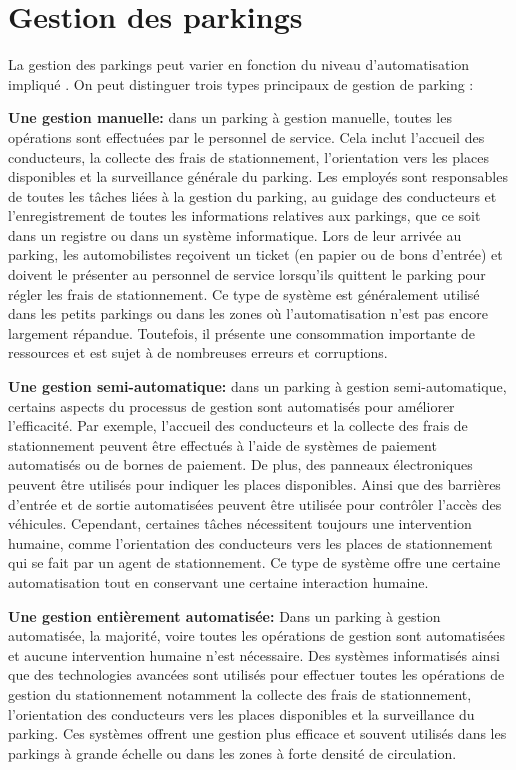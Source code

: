 \section{Gestion des parkings}

La gestion des parkings peut varier en fonction du niveau d'automatisation impliqué \cite{bensalah-master}. On peut distinguer trois types principaux de gestion de parking :

\begin{outline}

\1  \textbf{Une gestion manuelle: } dans un parking à gestion manuelle, 
toutes les opérations sont effectuées par le personnel de service. Cela inclut l'accueil des conducteurs, la collecte des frais de stationnement, l'orientation vers les places disponibles et la surveillance générale du parking. 
Les employés sont responsables de toutes les tâches liées à la gestion du parking, au guidage des conducteurs et l'enregistrement de toutes les informations relatives aux parkings, que ce soit dans un registre ou dans un système informatique. Lors de leur arrivée au parking, les automobilistes reçoivent un ticket (en papier ou de bons d'entrée) et doivent le présenter au personnel de service lorsqu'ils quittent le parking pour régler les frais de stationnement. Ce type de système est généralement utilisé dans les petits parkings ou dans les zones où l'automatisation n'est pas encore largement répandue. Toutefois, il  présente une consommation importante de ressources et est sujet à de nombreuses erreurs et corruptions.


\1  \textbf{Une gestion semi-automatique: } dans un parking à gestion semi-automatique, certains aspects du processus de gestion sont automatisés pour améliorer l'efficacité. Par exemple, l'accueil des conducteurs et la collecte des frais de stationnement peuvent être effectués à l'aide de systèmes de paiement automatisés ou de bornes de paiement. De plus, des panneaux électroniques peuvent être utilisés pour indiquer les places disponibles. Ainsi que des barrières d'entrée et de sortie automatisées peuvent être utilisée pour contrôler l'accès des véhicules. Cependant, certaines tâches nécessitent toujours une intervention humaine, comme l'orientation des conducteurs vers les places de stationnement qui se fait par un agent de stationnement. Ce type de système offre une certaine automatisation tout en conservant une certaine interaction humaine.


\1 \textbf{Une gestion entièrement automatisée: } Dans un parking à  gestion automatisée, la majorité, voire toutes les opérations de gestion sont automatisées et aucune intervention humaine n'est nécessaire. 
Des systèmes informatisés ainsi que des technologies avancées sont utilisés pour effectuer toutes les opérations de gestion du stationnement notamment la collecte des frais de stationnement, l'orientation des conducteurs vers les places disponibles et la surveillance du parking. Ces systèmes offrent une gestion plus efficace et souvent utilisés dans les parkings à grande échelle ou dans les zones à forte densité de circulation.

\end{outline}
